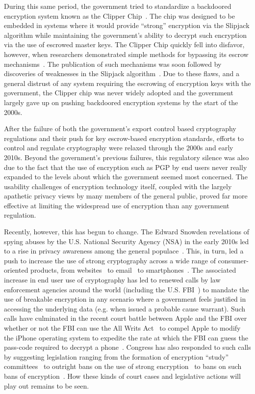 During this same period, the government tried to standardize a
backdoored encryption system known as the Clipper
Chip~\cite{whitehouse-clipper}. The chip was designed to be embedded
in systems where it would provide ``strong'' encryption via the
Slipjack algorithm while maintaining the government's ability to
decrypt such encryption via the use of escrowed master keys. The
Clipper Chip quickly fell into disfavor, however, when researchers
demonstrated simple methods for bypassing its escrow
mechanisms~\cite{blaze1994}. The publication of such mechanisms was
soon followed by discoveries of weaknesses in the Slipjack
algorithm~\cite{biham1998}. Due to these flaws, and a general distrust
of any system requiring the escrowing of encryption keys with the
government, the Clipper chip was never widely adopted and the
government largely gave up on pushing backdoored encryption systems by
the start of the 2000s.

After the failure of both the government's export control based
cryptography regulations and their push for key escrow-based
encryption standards, efforts to control and regulate cryptography
were relaxed through the 2000s and early 2010s. Beyond the
government's previous failures, this regulatory silence was also due
to the fact that the use of encryption such as PGP by end users never
really expanded to the levels about which the government seemed most
concerned. The usability challenges of encryption technology itself,
coupled with the largely apathetic privacy views by many members of
the general public, proved far more effective at limiting the
widespread use of encryption than any government regulation.

Recently, however, this has begun to change. The Edward Snowden
revelations of spying abuses by the U.S. National Security Agency
(NSA) in the early 2010s led to a rise in privacy awareness among the
general populace~\cite{pew-privsec14}. This, in turn, led a push to
increase the use of strong cryptography across a wide range of
consumer-oriented products, from websites~\cite{mozilla-deprecatehttp}
to email~\cite{gmail-blog-encryption} to
smartphones~\cite{ars-ios-encrypt, ars-android-encrypt}. The
associated increase in end user use of cryptography has led to renewed
calls by law enforcement agencies around the world (including the U.S.
FBI~\cite{comey-testimony-encryption}) to mandate the use of breakable
encryption in any scenario where a government feels justified in
accessing the underlying data (e.g. when issued a probable cause
warrant). Such calls have culminated in the recent court battle
between Apple and the FBI over whether or not the FBI can use the All
Writs Act~\cite{usc-allwrits} to compel Apple to modify the iPhone
operating system to expedite the rate at which the FBI can guess the
pass-code required to decrypt a phone~\cite{ars-cookvfbi}. Congress
has also responded to such calls by suggesting legislation ranging
from the formation of encryption ``study'' committees~\cite{hr4651} to
outright bans on the use of strong encryption~\cite{burrfeinstein} to
bans on such bans of encryption~\cite{hr4528}. How these kinds of
court cases and legislative actions will play out remains to be seen.


